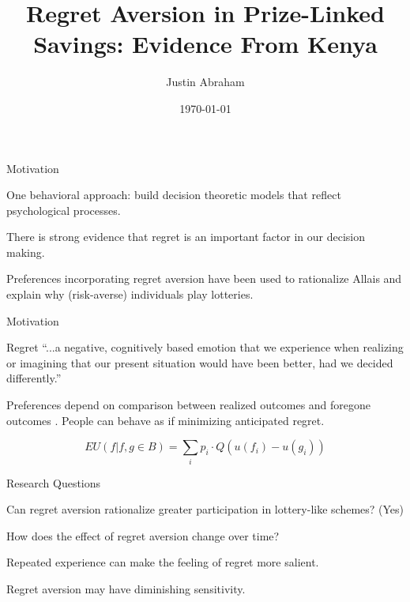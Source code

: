 \documentclass[aspectratio=169]{beamer}
\title{Regret Aversion in Prize-Linked Savings: Evidence From Kenya}
\author[Abraham]{Justin Abraham}
\institute{University of California, San Diego}
\date{\today}
\newenvironment{wideitemize}{\itemize\addtolength{\itemsep}{10pt}}{\enditemize}
\newenvironment{wideenumerate}{\enumerate\addtolength{\itemsep}{10pt}}{\endenumerate}
\begin{document}
\begin{frame}
	\titlepage
\end{frame}

\begin{frame}{Motivation}

	\begin{wideitemize}

		\item One behavioral approach: build decision theoretic models that reflect psychological processes.

		\item There is strong evidence that regret is an important factor in our decision making.

		\item Preferences incorporating regret aversion have been used to rationalize Allais and explain why (risk-averse) individuals play lotteries.

	\end{wideitemize}

\end{frame}

\begin{frame}{Motivation}

	\begin{block}{Regret}
	 ``...a negative, cognitively based emotion that we experience when realizing or imagining that our present situation would have been better, had we decided differently.''
	\end{block}

	Preferences depend on comparison between realized outcomes and foregone outcomes \parencite{bell_risk_1983,loomes_regret_1982}. People can behave as if minimizing anticipated regret.

	\[ EU(f | f, g \in B) =  \sum_i p_{i} \cdot Q\left(u\left(f_{i}\right)-u\left(g_{i}\right)\right) \]
	
\end{frame}

\begin{frame}{Research Questions}

	\begin{wideitemize}

		\item Can regret aversion rationalize greater participation in lottery-like schemes? (Yes)
		\item How does the effect of regret aversion change over time?

			\begin{wideenumerate}
				\item Repeated experience can make the feeling of regret more salient.
				\item Regret aversion may have diminishing sensitivity.
			\end{wideenumerate}

	\end{wideitemize}

\end{frame}
\end{document}
